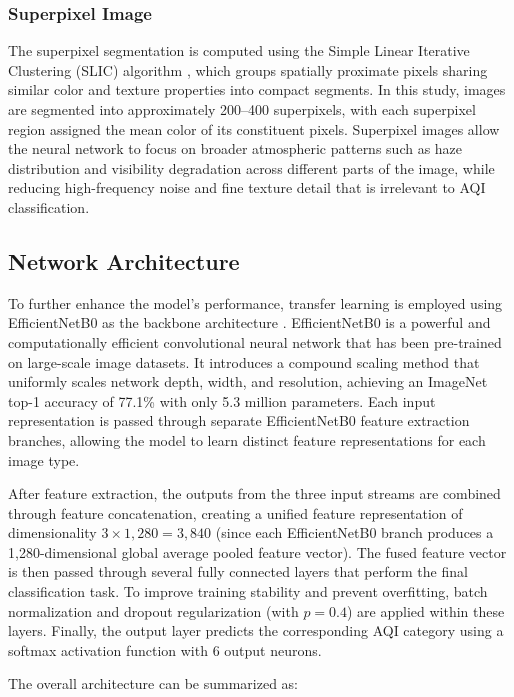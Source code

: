 \documentclass[conference]{IEEEtran}
\begin{document}
\subsubsection{Superpixel Image}
The superpixel segmentation is computed using the Simple Linear Iterative
Clustering (SLIC) algorithm \cite{zhang2021}, which groups spatially
proximate pixels sharing similar color and texture properties into compact
segments. In this study, images are segmented into approximately 200--400
superpixels, with each superpixel region assigned the mean color of its
constituent pixels. Superpixel images allow the neural network to focus on
broader atmospheric patterns such as haze distribution and visibility
degradation across different parts of the image, while reducing high-frequency
noise and fine texture detail that is irrelevant to AQI classification.

\subsection{Network Architecture}

To further enhance the model's performance, transfer learning is employed
using EfficientNetB0 as the backbone architecture \cite{tan2019efficientnet}.
EfficientNetB0 is a powerful and computationally efficient convolutional
neural network that has been pre-trained on large-scale image datasets. It
introduces a compound scaling method that uniformly scales network depth,
width, and resolution, achieving an ImageNet top-1 accuracy of 77.1\% with
only 5.3 million parameters. Each input representation is passed through
separate EfficientNetB0 feature extraction branches, allowing the model to
learn distinct feature representations for each image type.

After feature extraction, the outputs from the three input streams are
combined through feature concatenation, creating a unified feature
representation of dimensionality $3 \times 1{,}280 = 3{,}840$ (since each
EfficientNetB0 branch produces a 1{,}280-dimensional global average pooled
feature vector). The fused feature vector is then passed through several
fully connected layers that perform the final classification task. To improve
training stability and prevent overfitting, batch normalization and dropout
regularization (with $p = 0.4$) are applied within these layers. Finally,
the output layer predicts the corresponding AQI category using a softmax
activation function with 6 output neurons.

The overall architecture can be summarized as:
\end{document}

